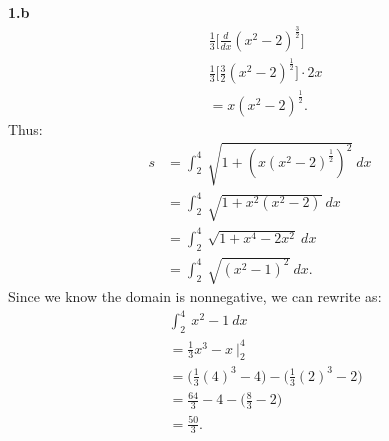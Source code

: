 \documentclass{report}
\begin{document}
    \pagebreak \bigbreak \noindent 
    \textbf{1.b}
    \bigbreak \noindent 
    \begin{align*}
        &\frac{1}{3}\bigg[\frac{d}{dx}(x^{2}-2)^{\frac{3}{2}}\bigg] \\
        &\frac{1}{3}\bigg[\frac{3}{2}(x^{2}-2)^{\frac{1}{2}}\bigg] \cdot 2x \\
        &=x(x^{2}-2)^{\frac{1}{2}}
    .\end{align*}
    \bigbreak \noindent 
    Thus:
    \begin{align*}
        s &= \int_{2}^{4}\ \sqrt{1+(x(x^{2}-2)^{\frac{1}{2}})^{2}}\ dx \\
          &=\int_{2}^{4}\ \sqrt{1+x^{2}(x^{2}-2)}\ dx \\
          &=\int_{2}^{4}\ \sqrt{1+x^{4}-2x^{2}}\ dx \\
          &=\int_{2}^{4}\ \sqrt{(x^{2}-1)^{2}}\ dx
    .\end{align*}
    \bigbreak \noindent 
    Since we know the domain is nonnegative, we can rewrite as:
    \begin{align*}
       &\int_{2}^{4}\ x^{2}-1\ dx  \\
       &=\frac{1}{3}x^{3}-x\ \bigg|_2^{4} \\
       &=\bigg(\frac{1}{3}(4)^{3}-4\bigg) - \bigg(\frac{1}{3}(2)^{3} -2\bigg) \\
       &=\frac{64}{3}-4 - \bigg(\frac{8}{3}-2\bigg) \\
       &=\frac{50}{3}
    .\end{align*}
\end{document}
